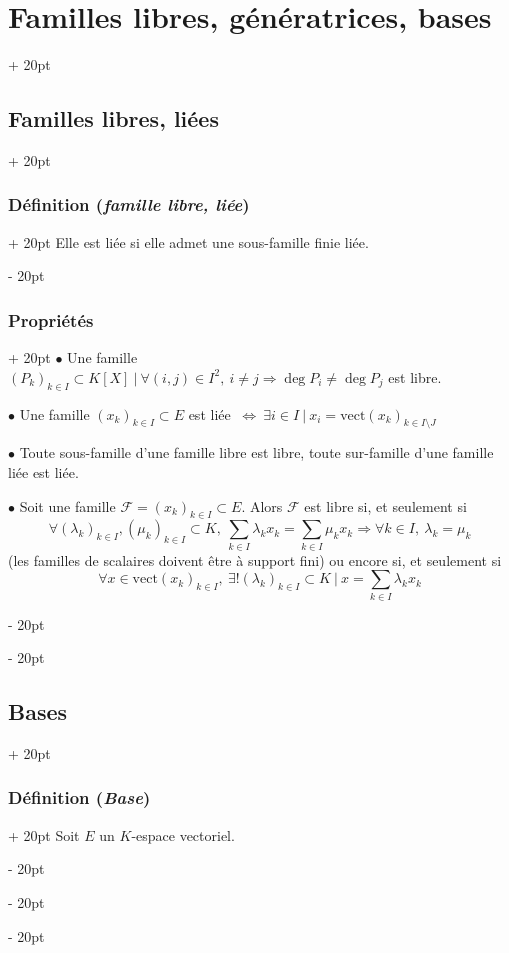 \documentclass[a4paper, 12pt, twoside]{article}
\newcommand{\ssi}{\ \Leftrightarrow \ }
\newcommand{\ind}[1][20pt]{\advance\leftskip + #1}
\newcommand{\deind}[1][20pt]{\advance\leftskip - #1}
\newenvironment{indt}[2][20pt]{#2 \par \ind[#1]}{\par \deind} %
\begin{document}
\begin{indt}{\section{Familles libres, génératrices, bases}}
\begin{indt}{\subsection{Familles libres, liées}}
\begin{indt}{\subsubsection{Définition (\textit{famille libre, liée})}}
                Elle est liée si elle admet une sous-famille finie liée.
            \end{indt}
            
            \vspace{12pt}
            
            \begin{indt}{\subsubsection{Propriétés}}
                $\bullet$ Une famille $(P_k)_{k \in I} \subset K[X]\ |\ \forall (i, j) \in I^2,\ i \neq j \Rightarrow \deg P_i \neq \deg P_j$ est libre.
                
                \vspace{12pt}
                
                $\bullet$ Une famille $(x_k)_{k \in I} \subset E$ est liée $\ssi \exists i \in I\ |\ x_i = \mathrm{vect}(x_k)_{k \in I \setminus J}$
                
                \vspace{12pt}
                
                $\bullet$ Toute sous-famille d'une famille libre est libre, toute sur-famille d'une famille liée est liée.
                
                \vspace{12pt}
                
                $\bullet$ Soit une famille $\mathcal F = (x_k)_{k \in I} \subset E$. Alors $\mathcal F$ est libre si, et seulement si
                    \[ \forall (\lambda_k)_{k \in I}, (\mu_k)_{k \in I} \subset K,\ \sum_{k \in I} \lambda_k x_k = \sum_{k \in I} \mu_k x_k \Rightarrow \forall k \in I,\ \lambda_k = \mu_k \]
                (les familles de scalaires doivent être à support fini) ou encore si, et seulement si
                    \[ \forall x \in \mathrm{vect}(x_k)_{k \in I},\ \exists! (\lambda_k)_{k \in I} \subset K\ |\ x = \sum_{k \in I} \lambda_k x_k \]
            \end{indt}
        \end{indt}
        
        \vspace{12pt}
        
        \begin{indt}{\subsection{Bases}}
            \begin{indt}{\subsubsection{Définition (\textit{Base})}}
                Soit $E$ un $K$-espace vectoriel.
                

\end{indt}
\end{indt}
\end{indt}
\end{document}
